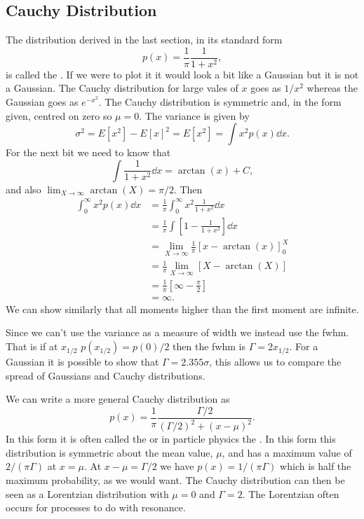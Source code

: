 \documentclass[a4paper]{article}
\begin{document}
    \subsection{Cauchy Distribution}
    The distribution derived in the last section, in its standard form
    \[p(x) = \frac{1}{\pi}\frac{1}{1 + x^2},\]
    is called the .
    If we were to plot it it would look a bit like a Gaussian but it is not a Gaussian.
    The Cauchy distribution for large vales of \(x\) goes as \(1/x^2\) whereas the Gaussian goes as \(e^{-x^2}\).
    The Cauchy distribution is symmetric and, in the form given, centred on zero so \(\mu = 0\).
    The variance is given by
    \[\sigma^2 = E[x^2] - E[x]^2 = E[x^2] = \int x^2p(x)\dd{x}.\]
    For the next bit we need to know that
    \[\int \frac{1}{1 + x^2}\dd{x} = \arctan(x) + C,\]
    and also 
    \(\lim_{X\to\infty}\arctan(X) = \pi/2\).
    Then
    \begin{align*}
        \int_{0}^{\infty}x^2p(x)\dd{x} &= \frac{1}{\pi}\int_0^\infty x^2\frac{1}{1 + x^2}\dd{x}\\ 
        &= \frac{1}{\pi}\int \left[1 - \frac{1}{1 + x^2}\right]\dd{x}\\
        &= \lim_{X\to\infty}\frac{1}{\pi}\left[x - \arctan(x)\right]_0^X\\
        &= \frac{1}{\pi}\lim_{X\to\infty}\left[X - \arctan(X)\right]\\
        &= \frac{1}{\pi}[\infty - \frac{\pi}{2}]\\
        &= \infty.
    \end{align*}
    We can show similarly that all moments higher than the first moment are infinite.
    
    Since we can't use the variance as a measure of width we instead use the \gls{fwhm}.
    That is if at \(x_{1/2}\) \(p(x_{1/2}) = p(0)/2\) then the \gls{fwhm} is \(\Gamma = 2x_{1/2}\).
    For a Gaussian it is possible to show that \(\Gamma = 2.355\sigma\), this allows us to compare the spread of Gaussians and Cauchy distributions.
    
    We can write a more general Cauchy distribution as
    \[p(x) = \frac{1}{\pi}\frac{\Gamma/2}{(\Gamma/2)^2 + (x - \mu)^2}.\]
    In this form it is often called the  or in particle physics the .
    In this form this distribution is symmetric about the mean value,  \(\mu\), and has a maximum value of \(2/(\pi\Gamma)\) at \(x = \mu\).
    At \(x - \mu = \Gamma/2\) we have \(p(x) = 1/(\pi\Gamma)\) which is half the maximum probability, as we would want.
    The Cauchy distribution can then be seen as a Lorentzian distribution with \(\mu = 0\) and \(\Gamma = 2\).
    The Lorentzian often occurs for processes to do with resonance.
    
\end{document}
